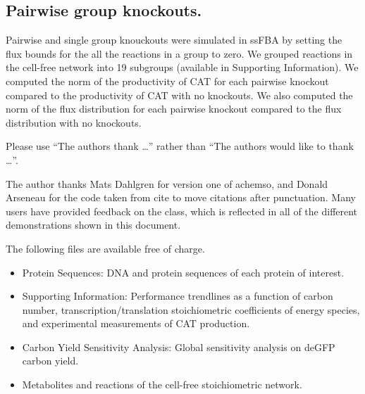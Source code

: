 \documentclass[journal=asbcd6,manuscript=article]{achemso}
\begin{document}
\subsection*{Pairwise group knockouts.}
Pairwise and single group knouckouts were simulated in ssFBA by setting the flux bounds for the all the reactions in a group to zero.
We grouped reactions in the cell-free network into 19 subgroups (available in Supporting Information).
We computed the norm of the productivity of CAT for each pairwise knockout compared to the productivity of CAT with no knockouts.
We also computed the norm of the flux distribution for each pairwise knockout compared to the flux distribution with no knockouts.
\begin{acknowledgement}

Please use ``The authors thank \ldots'' rather than ``The
authors would like to thank \ldots''.

The author thanks Mats Dahlgren for version one of \textsf{achemso},
and Donald Arseneau for the code taken from \textsf{cite} to move
citations after punctuation. Many users have provided feedback on the
class, which is reflected in all of the different demonstrations
shown in this document.

\end{acknowledgement}

\begin{suppinfo}
The following files are available free of charge.
\begin{itemize}
  \item Protein Sequences: DNA and protein sequences of each protein of interest.
  \item Supporting Information: Performance trendlines as a function of carbon number, transcription/translation stoichiometric coefficients of energy species, and experimental measurements of CAT production.
  \item Carbon Yield Sensitivity Analysis: Global sensitivity analysis on deGFP carbon yield.
  \item Metabolites and reactions of the cell-free stoichiometric network.
\end{itemize}
\end{suppinfo}

\clearpage


\end{document}
